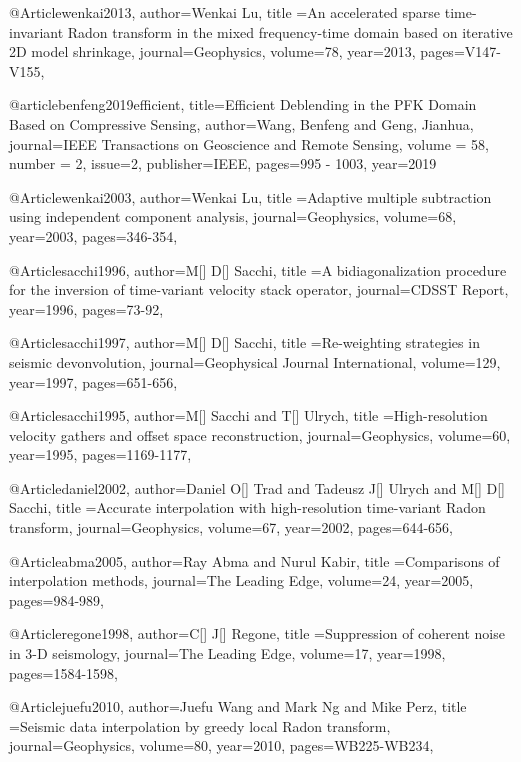 @Article{wenkai2013,
  author={Wenkai Lu},
  title ={An accelerated sparse time-invariant Radon transform in the mixed frequency-time domain based on iterative 2{D} model shrinkage},
  journal={Geophysics},
  volume=78,
  year=2013,
  pages={V147-V155},
}

@article{benfeng2019efficient,
  title={Efficient Deblending in the PFK Domain Based on Compressive Sensing},
  author={Wang, Benfeng and Geng, Jianhua},
  journal={IEEE Transactions on Geoscience and Remote Sensing},
	volume = {58},
	number = {2},
	issue=2,
  publisher={IEEE},
  pages={995 - 1003},
    year={2019}
}

@Article{wenkai2003,
  author={Wenkai Lu},
  title ={Adaptive multiple subtraction using independent component analysis},
  journal={Geophysics},
  volume=68,
  year=2003,
  pages={346-354},
}

@Article{sacchi1996,
  author={M[] D[] Sacchi},
  title ={A bidiagonalization procedure for the inversion of time-variant velocity stack operator},
  journal={CDSST Report},
  year=1996,
  pages={73-92},
}

@Article{sacchi1997,
  author={M[] D[] Sacchi},
  title ={Re-weighting strategies in seismic devonvolution},
  journal={Geophysical Journal International},
  volume=129,
  year=1997,
  pages={651-656},
}

@Article{sacchi1995,
  author={M[] Sacchi and T[] Ulrych},
  title ={High-resolution velocity gathers and offset space reconstruction},
  journal={Geophysics},
  volume=60,
  year=1995,
  pages={1169-1177},
}

@Article{daniel2002,
  author={Daniel O[] Trad and Tadeusz J[] Ulrych and M[] D[] Sacchi},
  title ={Accurate interpolation with high-resolution time-variant Radon transform},
  journal={Geophysics},
  volume=67,
  year=2002,
  pages={644-656},
}

@Article{abma2005,
  author={Ray Abma and Nurul Kabir},
  title ={Comparisons of interpolation methods},
  journal={The Leading Edge},
  volume=24,
  year=2005,
  pages={984-989},
}

@Article{regone1998,
  author={C[] J[] Regone},
  title ={Suppression of coherent noise in 3-{D} seismology},
  journal={The Leading Edge},
  volume=17,
  year=1998,
  pages={1584-1598},
}

@Article{juefu2010,
  author={Juefu Wang and Mark Ng and Mike Perz},
  title ={Seismic data interpolation by greedy local Radon transform},
  journal={Geophysics},
  volume=80,
  year=2010,
  pages={WB225-WB234},
}

